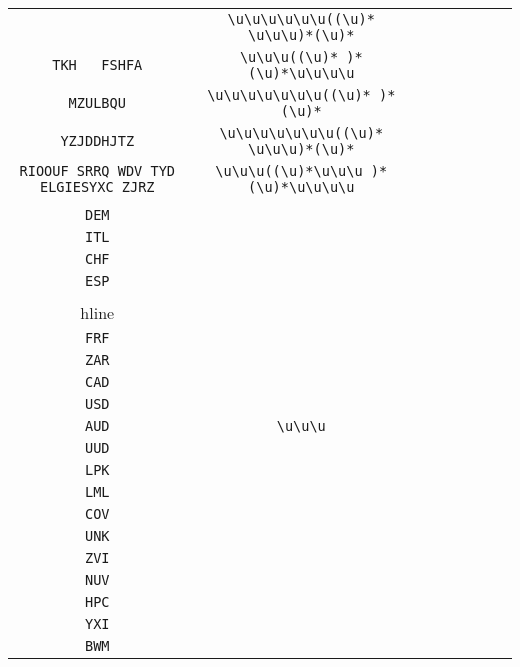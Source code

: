 \begin{longtable}{cccccccc}
\begin{tabular}{ll}
    \verb|KDFGGJQJS BSC| & \verb|\u\u\u\u\u\u((\u)* \u\u\u)*(\u)*|\\
\verb|TKH   FSHFA| & \verb|\u\u\u((\u)* )*(\u)*\u\u\u\u|\\
\verb|MZULBQU| & \verb|\u\u\u\u\u\u\u((\u)* )*(\u)*|\\
\verb|YZJDDHJTZ| & \verb|\u\u\u\u\u\u\u((\u)* \u\u\u)*(\u)*|\\
\verb|RIOOUF SRRQ WDV TYD ELGIESYXC ZJRZ| & \verb|\u\u\u((\u)*\u\u\u )*(\u)*\u\u\u\u|
\end{tabular}
\\\midrule 
\begin{tabular}{l}
    \verb|XEU|\\
\verb|DEM|\\
\verb|ITL|\\
\verb|CHF|\\
\verb|ESP|\\
\\hline\\
\verb|FRF|\\
\verb|ZAR|\\
\verb|CAD|\\
\verb|USD|\\
\verb|AUD|
\end{tabular}

&
\verb|\u\u\u|
&

\begin{tabular}{l}
    \verb|\u\u\u|\\
\verb|UUD|\\
\verb|LPK|\\
\verb|LML|\\
\verb|COV|\\
\verb|UNK|
\end{tabular}

&

\begin{tabular}{l}
    \verb|\u\u\u|\\
\verb|ZVI|\\
\verb|NUV|\\
\verb|HPC|\\
\verb|YXI|\\
\verb|BWM|
\end{tabular}

&


\end{longtable}
